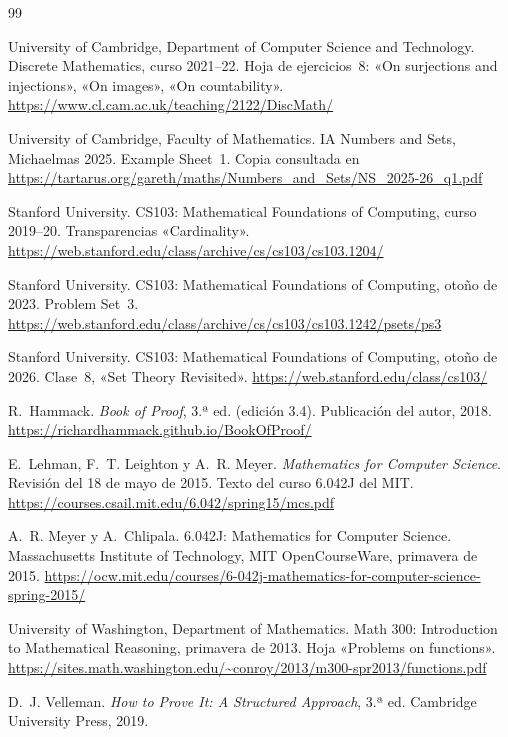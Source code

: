\begin{thebibliography}{99}
\small

University of Cambridge, Department of Computer Science and Technology.
\newblock Discrete Mathematics, curso 2021--22.
\newblock Hoja de ejercicios~8: «On surjections and injections», «On images», «On countability».
\newblock \url{https://www.cl.cam.ac.uk/teaching/2122/DiscMath/}

University of Cambridge, Faculty of Mathematics.
\newblock IA Numbers and Sets, Michaelmas 2025.
\newblock Example Sheet~1.
\newblock Copia consultada en \url{https://tartarus.org/gareth/maths/Numbers_and_Sets/NS_2025-26_q1.pdf}

Stanford University.
\newblock CS103: Mathematical Foundations of Computing, curso 2019--20.
\newblock Transparencias «Cardinality».
\newblock \url{https://web.stanford.edu/class/archive/cs/cs103/cs103.1204/}

Stanford University.
\newblock CS103: Mathematical Foundations of Computing, otoño de 2023.
\newblock Problem Set~3.
\newblock \url{https://web.stanford.edu/class/archive/cs/cs103/cs103.1242/psets/ps3}

Stanford University.
\newblock CS103: Mathematical Foundations of Computing, otoño de 2026.
\newblock Clase~8, «Set Theory Revisited».
\newblock \url{https://web.stanford.edu/class/cs103/}

R.~Hammack.
\newblock \emph{Book of Proof}, 3.ª ed. (edición 3.4).
\newblock Publicación del autor, 2018.
\newblock \url{https://richardhammack.github.io/BookOfProof/}

E.~Lehman, F.~T. Leighton y A.~R. Meyer.
\newblock \emph{Mathematics for Computer Science}.
\newblock Revisión del 18 de mayo de 2015. Texto del curso 6.042J del MIT.
\newblock \url{https://courses.csail.mit.edu/6.042/spring15/mcs.pdf}

A.~R. Meyer y A.~Chlipala.
\newblock 6.042J: Mathematics for Computer Science.
\newblock Massachusetts Institute of Technology, MIT OpenCourseWare, primavera de 2015.
\newblock \url{https://ocw.mit.edu/courses/6-042j-mathematics-for-computer-science-spring-2015/}

University of Washington, Department of Mathematics.
\newblock Math 300: Introduction to Mathematical Reasoning, primavera de 2013.
\newblock Hoja «Problems on functions».
\newblock \url{https://sites.math.washington.edu/~conroy/2013/m300-spr2013/functions.pdf}

D.~J. Velleman.
\newblock \emph{How to Prove It: A Structured Approach}, 3.ª ed.
\newblock Cambridge University Press, 2019.

\end{thebibliography}

